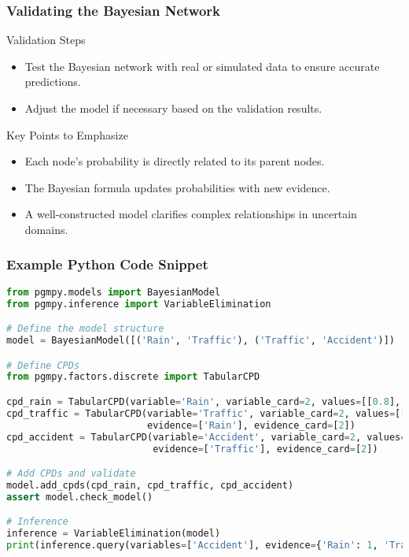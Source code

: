 \documentclass[aspectratio=169]{beamer}
\begin{document}
\begin{frame}[fragile]
    \frametitle{Validating the Bayesian Network}
    \begin{block}{Validation Steps}
        \begin{itemize}
            \item Test the Bayesian network with real or simulated data to ensure accurate predictions.
            \item Adjust the model if necessary based on the validation results.
        \end{itemize}
    \end{block}
    
    \begin{block}{Key Points to Emphasize}
        \begin{itemize}
            \item Each node's probability is directly related to its parent nodes.
            \item The Bayesian formula updates probabilities with new evidence.
            \item A well-constructed model clarifies complex relationships in uncertain domains.
        \end{itemize}
    \end{block}
\end{frame}

\begin{frame}[fragile]
    \frametitle{Example Python Code Snippet}
    \begin{lstlisting}[language=Python]
from pgmpy.models import BayesianModel
from pgmpy.inference import VariableElimination

# Define the model structure
model = BayesianModel([('Rain', 'Traffic'), ('Traffic', 'Accident')])

# Define CPDs
from pgmpy.factors.discrete import TabularCPD

cpd_rain = TabularCPD(variable='Rain', variable_card=2, values=[[0.8], [0.2]])
cpd_traffic = TabularCPD(variable='Traffic', variable_card=2, values=[[0.2, 0.8], [0.8, 0.2]], 
                         evidence=['Rain'], evidence_card=[2])
cpd_accident = TabularCPD(variable='Accident', variable_card=2, values=[[0.9, 0.1], [0.1, 0.9]], 
                          evidence=['Traffic'], evidence_card=[2])

# Add CPDs and validate
model.add_cpds(cpd_rain, cpd_traffic, cpd_accident)
assert model.check_model()

# Inference
inference = VariableElimination(model)
print(inference.query(variables=['Accident'], evidence={'Rain': 1, 'Traffic': 1}))
    \end{lstlisting}
\end{frame}
\end{document}

